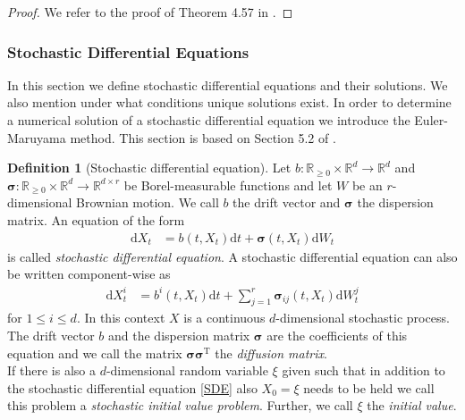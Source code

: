 \documentclass[11pt,titlepage]{article}
\newcommand{\R}{\mathbb{R}} %
\theoremstyle{definition}
\newtheorem{definition}[theorem]{Definition}
\theoremstyle{remark}
\begin{document}
	\begin{proof}
		We refer to the proof of Theorem 4.57 in \cite{Jacod2003}.
	\end{proof}

	\subsubsection{Stochastic Differential Equations}
	
	In this section we define stochastic differential equations and their solutions. We also mention 
	under what conditions unique solutions exist. In order to determine a numerical solution 
	of a stochastic differential equation we introduce the Euler-Maruyama method. This section is based on Section 5.2 of \cite{Karatzas2012}.
	
	\begin{definition}[Stochastic differential equation]\label{Def SDE}
		Let $b:\R_{\geq 0} \times \R^d \to \R^d$ and $\boldsymbol{\sigma}:\R_{\geq 0} \times \R^d\to\R^{d\times r}$ 
		be Borel-measurable functions and let $W$ be an $r$-dimensional Brownian motion. We call $b$ the drift vector and $\boldsymbol{\sigma}$ the 
		dispersion matrix. An equation of the form
		\begin{align}
			\mathrm{d}X_t &= b(t, X_t)\mathrm{d}t + \boldsymbol{\sigma}(t, X_t)\mathrm{d}W_t \label{SDE}
		\end{align}
		is called \textsl{stochastic differential equation}. A stochastic differential equation can also be written component-wise as
		\begin{align*}
			\mathrm{d}X^i_t &= b^i(t, X_t)\mathrm{d}t + \sum_{j=1}^r \boldsymbol{\sigma}_{ij}(t, X_t)\mathrm{d}W^j_t
		\end{align*}
		for $1\leq i \leq d$. In this context $X$ is a continuous $d$-dimensional stochastic process. %
		The drift vector $b$ and the dispersion matrix $\boldsymbol{\sigma}$ are 
		the coefficients of this equation and we call the matrix $\boldsymbol{\sigma}\boldsymbol{\sigma}^{\mathrm{T}}$ the \textsl{diffusion matrix}.\\
		If there is also a $d$-dimensional random variable $\xi$ given such that in 
		addition to the stochastic differential equation \ref{SDE} also $X_0 = \xi$ needs 
		to be held we call this problem a \textsl{stochastic initial value problem}. Further, we call $\xi$ 
		the \textsl{initial value}.
	\end{definition}
	
\end{document}
